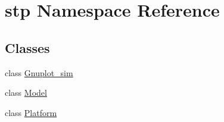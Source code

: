 \hypertarget{namespacestp}{}\section{stp Namespace Reference}
\label{namespacestp}
\subsection*{Classes}
\begin{DoxyCompactItemize}
\item 
class \hyperlink{classstp_1_1_gnuplot__sim}{Gnuplot\+\_\+sim}
\item 
class \hyperlink{classstp_1_1_model}{Model}
\item 
class \hyperlink{classstp_1_1_platform}{Platform}
\end{DoxyCompactItemize}
